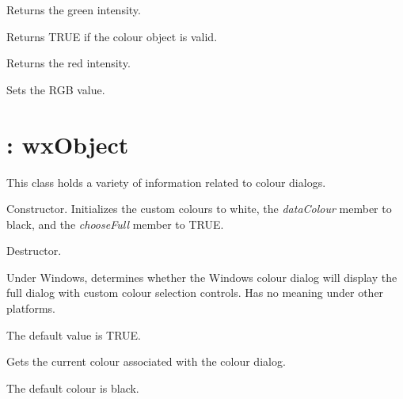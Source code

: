 Returns the green intensity.



Returns TRUE if the colour object is valid.



Returns the red intensity.



Sets the RGB value.


\section{: wxObject}\label{wxcolourdata}


This class holds a variety of information related to colour dialogs.



Constructor. Initializes the custom colours to white, the {\it dataColour} member
to black, and the {\it chooseFull} member to TRUE.



Destructor.



Under Windows, determines whether the Windows colour dialog will display the full dialog
with custom colour selection controls. Has no meaning under other platforms.

The default value is TRUE.



Gets the current colour associated with the colour dialog.

The default colour is black.


